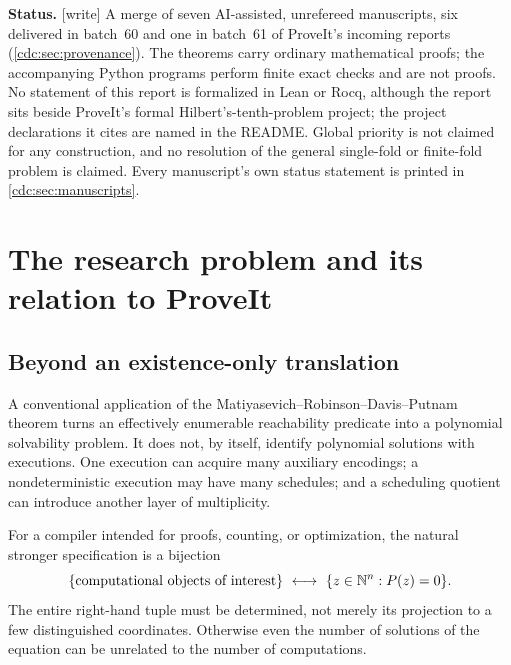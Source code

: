 \documentclass[11pt,a4paper]{article}
\theoremstyle{definition}
\theoremstyle{remark}
\newcommand{\N}{\mathbb N}
\newcommand{\wtag}{\textup{[write]}}%
\begin{document}
\begin{titlepage}
\begin{abstract}
Part~IX proves, with proofs from four manuscripts and a sketch in a fifth, that a single-fold (finite-fold) polynomial for universal halting exists exactly when every computably enumerable set has a single-fold (finite-fold) Diophantine representation, which is an open problem that this report does not solve.
\end{abstract}
\vspace{2mm}
\begin{resultbox}
\small\textbf{Status.} \wtag{} A merge of seven AI-assisted, unrefereed manuscripts, six delivered in batch~60 and one in batch~61 of ProveIt's incoming reports (\cref{cdc:sec:provenance}). The theorems carry ordinary mathematical proofs; the accompanying Python programs perform finite exact checks and are not proofs. No statement of this report is formalized in Lean or Rocq, although the report sits beside ProveIt's formal Hilbert's-tenth-problem project; the project declarations it cites are named in the README. Global priority is not claimed for any construction, and no resolution of the general single-fold or finite-fold problem is claimed. Every manuscript's own status statement is printed in \cref{cdc:sec:manuscripts}.
\end{resultbox}
\end{titlepage}
\hypersetup{pageanchor=true}
\setcounter{page}{1}

\tableofcontents
\newpage

\section{The research problem and its relation to ProveIt}
\label{cdc:sec:intro}
\subsection{Beyond an existence-only translation}
A conventional application of the Matiyasevich--Robinson--Davis--Putnam theorem turns an effectively enumerable reachability predicate into a polynomial solvability problem. It does not, by itself, identify polynomial solutions with executions. One execution can acquire many auxiliary encodings; a nondeterministic execution may have many schedules; and a scheduling quotient can introduce another layer of multiplicity.

For a compiler intended for proofs, counting, or optimization, the natural stronger specification is a bijection
\begin{equation}\label{cdc:eq:goal}
\{\hbox{computational objects of interest}\}
\ \longleftrightarrow\
\{z\in\N^n:P(z)=0\}.
\end{equation}
The entire right-hand tuple must be determined, not merely its projection to a few distinguished coordinates. Otherwise even the number of solutions of the equation can be unrelated to the number of computations.
\end{document}
